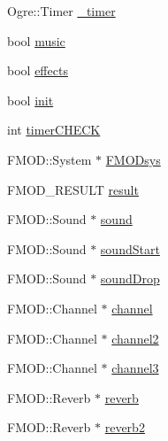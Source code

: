 \begin{DoxyCompactItemize}
Ogre\-::\-Timer \hyperlink{class_base_application_a7e2bb2cec7b0185bf861d5bf5f8c015c}{\-\_\-timer}
\item 
bool \hyperlink{class_base_application_a3cd36d39f168b56476c22d27cf9cb429}{music}
\item 
bool \hyperlink{class_base_application_a4a21a832334bce0266af82d97208c5d1}{effects}
\item 
bool \hyperlink{class_base_application_adadae473e6c936a899153c205c2de07d}{init}
\item 
int \hyperlink{class_base_application_aad18724507e497250a90dd9d12d24920}{timer\-C\-H\-E\-C\-K}
\item 
F\-M\-O\-D\-::\-System $\ast$ \hyperlink{class_base_application_ac45b5d8be5f852e28d13b2009c45b5a5}{F\-M\-O\-Dsys}
\item 
F\-M\-O\-D\-\_\-\-R\-E\-S\-U\-L\-T \hyperlink{class_base_application_ad50a268c7b77ee4e910eca0d96430705}{result}
\item 
F\-M\-O\-D\-::\-Sound $\ast$ \hyperlink{class_base_application_aea4ddf4bf2fe2f475e75ac1754e64b0c}{sound}
\item 
F\-M\-O\-D\-::\-Sound $\ast$ \hyperlink{class_base_application_ac1cb587fccc3d6d0a263d484bc6829bc}{sound\-Start}
\item 
F\-M\-O\-D\-::\-Sound $\ast$ \hyperlink{class_base_application_aab866d736fb7032813be4f0692bf40a6}{sound\-Drop}
\item 
F\-M\-O\-D\-::\-Channel $\ast$ \hyperlink{class_base_application_ab6938e41749182bbe867f455ad52cf09}{channel}
\item 
F\-M\-O\-D\-::\-Channel $\ast$ \hyperlink{class_base_application_aceea4286991e9718baa4278671d8c836}{channel2}
\item 
F\-M\-O\-D\-::\-Channel $\ast$ \hyperlink{class_base_application_adfa511eb6241720fc95c1c32f92deb80}{channel3}
\item 
F\-M\-O\-D\-::\-Reverb $\ast$ \hyperlink{class_base_application_a92820c32798f0d3928fcce24787eda1f}{reverb}
\item 
F\-M\-O\-D\-::\-Reverb $\ast$ \hyperlink{class_base_application_a1b0ab0994f1beef254a3020b5b2a0945}{reverb2}
\end{DoxyCompactItemize}


